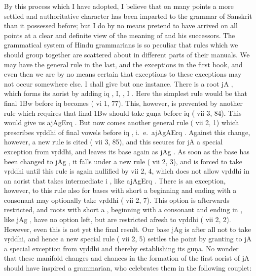 By this process which I have adopted, I believe that on many points a
more settled and authoritative character has been imparted to the
grammar of Sanskrit than it possessed before; but I do by no means
pretend to have arrived on all points at a clear and definite view of
the meaning of \panini{} and his successors. The grammatical system of
Hindu grammarians is so peculiar that rules which we should group
together are scattered about in different parts of their manuals. We may
have the general rule in the last, and the exceptions in the first book,
and even then we are by no means certain that exceptions to these
exceptions may not occur somewhere else. I shall give but one instance.
There is a root {\dn jA} , which forms its aorist by adding
{\dn iq\2} , {\dn I,} , {\dn I} . Here the simplest
rule would be that final {\dn \31Bw}  before {\dn iq\2}  becomes
{\dn {}}  (\panini{} vi 1, 77). This, however, is prevented by another
rule which requires that final {\dn \31Bw}  should take guṇa before
{\dn iq\2}  (\panini{} vii 3, 84). This would give us
{\dn ajAgErq\2} . But now comes another general rule
(\panini{} vii 2, 1) which prescribes vṛddhi of final vowels before
{\dn iq\2} , i.\ e.\ {\dn ajAgAErq\2} . Against
this change, however, a new rule is cited (\panini{} vii 3, 85), and
this secures for {\dn jA}  a special exception from vṛddhi, and
leaves its base again as {\dn jAg} . As soon as the base has
been changed to {\dn jAg} , it falls under a new rule
(\panini{} vii 2, 3), and is forced to take vṛddhi until this rule is
again nullified by \panini{} vii 2, 4, which does not allow vṛddhi in an
aorist that takes intermediate {\dn i} , like {\dn ajAgErq\2}
. There is an exception, however, to this rule also for
bases with short {\dn a}  beginning and ending with a consonant may
optionally take vṛddhi (\panini{} vii 2, 7). This option is afterwards
restricted, and roots with short {\dn a} , beginning with a consonant
and ending in {\dn {}} , like {\dn jAg} , have no option
left, but are restricted afresh to vṛddhi (\panini{} vii 2, 2). However,
even this is not yet the final result. Our base {\dn jAg}  is
after all not to take vṛddhi, and hence a new special rule (\panini{}
vii 2, 5) settles the point by granting to {\dn jA}  a special
exception from vṛddhi and thereby establishing its guṇa. No wonder that
these manifold changes and chances in the formation of the first aorist
of {\dn jA}  should have inspired a grammarian, who celebrates
them in the following couplet:

